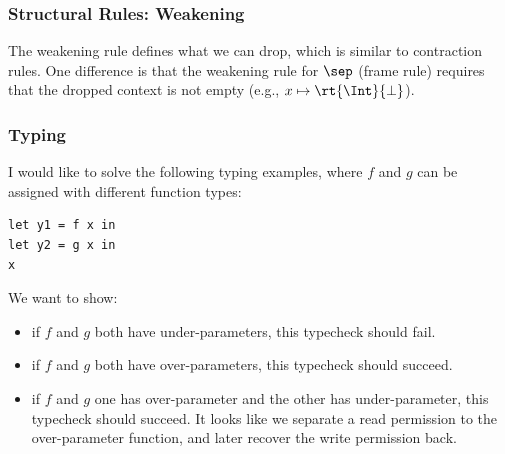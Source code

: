 \begin{frame}
    \frametitle{Structural Rules: Weakening}   

\begin{figure}[!ht]
\quad
{}
\quad
{}
\end{figure}

The weakening rule defines what we can drop, which is similar to contraction rules. One difference is that the weakening rule for $\sep$ (frame rule) requires that the dropped context is not empty (e.g., $x\mapsto\rt{\Int}{\bot}$).
\end{frame}

\begin{frame}[fragile]
    \frametitle{Typing}   

I would like to solve the following typing examples, where $f$ and $g$ can be assigned with different function types:

\begin{verbatim}
let y1 = f x in
let y2 = g x in
x
\end{verbatim}

We want to show:
\begin{itemize}
    \item if $f$ and $g$ both have under-parameters, this typecheck should fail.
    \item if $f$ and $g$ both have over-parameters, this typecheck should succeed.
    \item if $f$ and $g$ one has over-parameter and the other has under-parameter, this typecheck should succeed. 
    It looks like we separate a read permission to the over-parameter function, and later recover the write permission back.
\end{itemize}

\end{frame}

